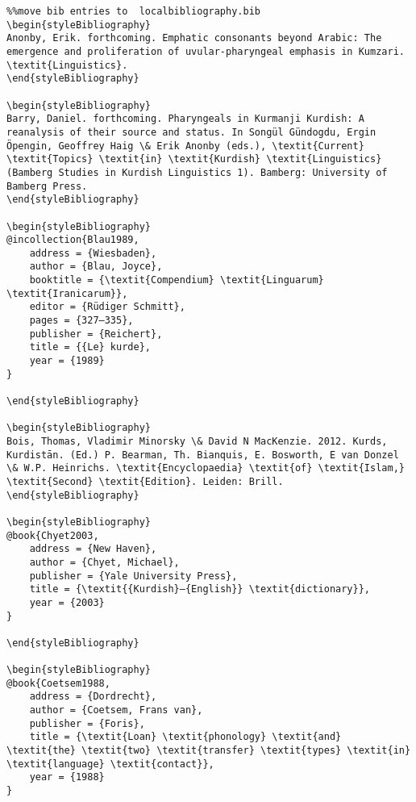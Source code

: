 \documentclass[output=paper]{langsci/langscibook}
\begin{document}
\begin{verbatim}%%move bib entries to  localbibliography.bib
\begin{styleBibliography}
Anonby, Erik. forthcoming. Emphatic consonants beyond Arabic: The emergence and proliferation of uvular-pharyngeal emphasis in Kumzari. \textit{Linguistics}.
\end{styleBibliography}

\begin{styleBibliography}
Barry, Daniel. forthcoming. Pharyngeals in Kurmanji Kurdish: A reanalysis of their source and status. In Songül Gündogdu, Ergin Öpengin, Geoffrey Haig \& Erik Anonby (eds.), \textit{Current} \textit{Topics} \textit{in} \textit{Kurdish} \textit{Linguistics} (Bamberg Studies in Kurdish Linguistics 1). Bamberg: University of Bamberg Press.
\end{styleBibliography}

\begin{styleBibliography}
@incollection{Blau1989,
	address = {Wiesbaden},
	author = {Blau, Joyce},
	booktitle = {\textit{Compendium} \textit{Linguarum} \textit{Iranicarum}},
	editor = {Rüdiger Schmitt},
	pages = {327–335},
	publisher = {Reichert},
	title = {{Le} kurde},
	year = {1989}
}

\end{styleBibliography}

\begin{styleBibliography}
Bois, Thomas, Vladimir Minorsky \& David N MacKenzie. 2012. Kurds, Kurdistān. (Ed.) P. Bearman, Th. Bianquis, E. Bosworth, E van Donzel \& W.P. Heinrichs. \textit{Encyclopaedia} \textit{of} \textit{Islam,} \textit{Second} \textit{Edition}. Leiden: Brill.
\end{styleBibliography}

\begin{styleBibliography}
@book{Chyet2003,
	address = {New Haven},
	author = {Chyet, Michael},
	publisher = {Yale University Press},
	title = {\textit{{Kurdish}–{English}} \textit{dictionary}},
	year = {2003}
}

\end{styleBibliography}

\begin{styleBibliography}
@book{Coetsem1988,
	address = {Dordrecht},
	author = {Coetsem, Frans van},
	publisher = {Foris},
	title = {\textit{Loan} \textit{phonology} \textit{and} \textit{the} \textit{two} \textit{transfer} \textit{types} \textit{in} \textit{language} \textit{contact}},
	year = {1988}
}


\end{verbatim}
\end{document}
